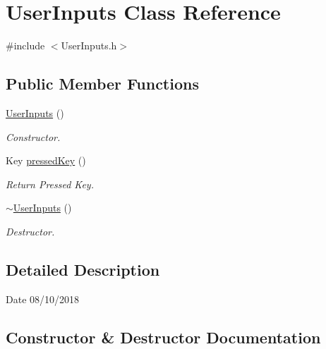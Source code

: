 \hypertarget{class_user_inputs}{}\section{User\+Inputs Class Reference}
\label{class_user_inputs}


{\ttfamily \#include $<$User\+Inputs.\+h$>$}

\subsection*{Public Member Functions}
\begin{DoxyCompactItemize}
\item 
\mbox{\hyperlink{class_user_inputs_a170fad7b65feb0665b39d9ca9a31a9fd}{User\+Inputs}} ()
\begin{DoxyCompactList}\small\item\em Constructor. \end{DoxyCompactList}\item 
Key \mbox{\hyperlink{class_user_inputs_a37ed9f4c956fd8dc4f3bc8a96e61933b}{pressed\+Key}} ()
\begin{DoxyCompactList}\small\item\em Return Pressed Key. \end{DoxyCompactList}\item 
\mbox{\label{class_user_inputs_a3cf9ef9cac7d85e3ad9efe2cfc20271a}} 
\mbox{\hyperlink{class_user_inputs_a3cf9ef9cac7d85e3ad9efe2cfc20271a}{$\sim$\+User\+Inputs}} ()
\begin{DoxyCompactList}\small\item\em Destructor. \end{DoxyCompactList}\end{DoxyCompactItemize}


\subsection{Detailed Description}
\begin{DoxyDate}{Date}
08/10/2018 
\end{DoxyDate}


\subsection{Constructor \& Destructor Documentation}
\mbox{\label{class_user_inputs_a170fad7b65feb0665b39d9ca9a31a9fd}} 
